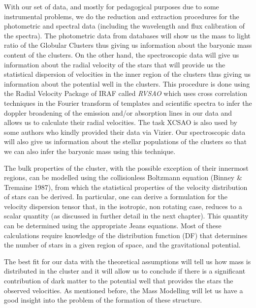 With our set of data, and mostly for pedagogical purposes due to some instrumental problems, we do the reduction and extraction procedures for the photometric and spectral data (including the wavelength and flux calibration of the spectra). The photometric data from databases will show us the mass to light ratio of the Globular Clusters thus giving us information about the baryonic mass content of the clusters. On the other hand, the spectroscopic data will give us information about the radial velocity of the stars that will provide us the statistical dispersion of velocities in the inner region of the clusters thus giving us information about the potential well in the clusters.  This procedure is done using the Radial Velocity Package of IRAF called \textit{RVSAO} which uses cross correlation techniques in the Fourier transform of templates and scientific spectra to infer the doppler broadening of the emission and/or absorption lines in our data and allows us to calculate their radial velocities. The task XCSAO is also used by some authors who kindly provided their data via Vizier. Our spectroscopic data will also give us information about the stellar populations of the clusters so that we can also infer the baryonic mass using this technique. 

The bulk properties of the cluster, with the possible exception of their innermost regions, can be modelled using the collisionless Boltzmann equation (Binney \& Tremaine 1987), from which the statistical properties of the velocity distribution of stars can be derived. In particular, one can derive a formulation for the velocity dispersion tensor that, in the isotropic, non rotating case, reduces to a scalar quantity (as discussed in further detail in the next chapter). This quantity can be determined using the appropriate Jeans equations. Most of these calculations require knowledge of the distribution function (DF) that determines the number of stars in a given region of space, and the gravitational potential.

The best fit for our data with the theoretical assumptions will tell us how mass is distributed in the cluster and it will allow us to conclude if there is a significant contribution of dark matter to the potential well that provides the stars the observed velocities. As mentioned before, the Mass Modelling will let us have a good insight into the problem of the formation of these structure.

\newpage

